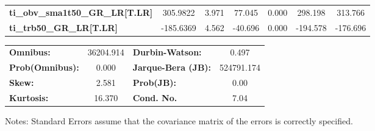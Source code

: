\begin{center}
\begin{tabular}{lcccccc}
\textbf{ti\_obv\_sma1t50\_GR\_LR[T.LR]} &     305.9822  &        3.971     &    77.045  &         0.000        &      298.198    &      313.766     \\
\textbf{ti\_trb50\_GR\_LR[T.LR]}        &    -185.6369  &        4.562     &   -40.696  &         0.000        &     -194.578    &     -176.696     \\
\bottomrule
\end{tabular}
\begin{tabular}{lclc}
\textbf{Omnibus:}       & 36204.914 & \textbf{  Durbin-Watson:     } &     0.497   \\
\textbf{Prob(Omnibus):} &    0.000  & \textbf{  Jarque-Bera (JB):  } & 524791.174  \\
\textbf{Skew:}          &    2.581  & \textbf{  Prob(JB):          } &      0.00   \\
\textbf{Kurtosis:}      &   16.370  & \textbf{  Cond. No.          } &      7.04   \\
\bottomrule
\end{tabular}
\end{center}

Notes: \newline
 [1] Standard Errors assume that the covariance matrix of the errors is correctly specified.

